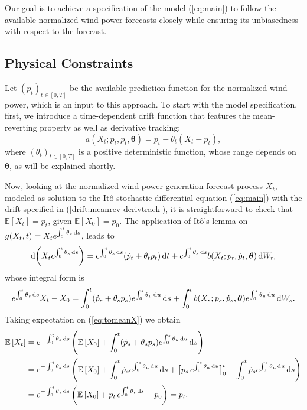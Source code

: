 \documentclass[11pt]{article}
\theoremstyle{definition}
\begin{document}
Our goal is to achieve a specification of the model (\ref{eq:main}) to follow the available normalized wind power forecasts closely while ensuring its unbiasedness with respect to the forecast.

\subsection{Physical Constraints} \label{Physical_Constraints}

Let $(p_t)_{t \in [0,T]}$ be the available prediction function for the normalized wind power, which is an input to this approach. To start with the model specification, first, we introduce a time-dependent drift function that features the mean-reverting property as well as derivative tracking:\begin{equation}
a(X_t; p_t, \dot{p}_t, \bm{\theta}) = \dot{p}_t  - \theta_t (X_t - p_t),  \label{drift:meanrev-derivtrack}
\end{equation} 
where $ (\theta_t)_{t \in [0,T]} $ is a positive deterministic function, whose range depends on $\bm{\theta}$, as will be explained shortly.

Now, looking at the normalized wind power generation forecast process $X_t$, modeled as solution to the It\^{o} stochastic differential equation (\ref{eq:main}) with the drift specified in (\ref{drift:meanrev-derivtrack}), it is straightforward to check that $\mathbb{E} \left[X_t\right] = p_t$, given $  \mathbb{E}\left[X_0\right] = p_0$. The application of  It\^{o}'s lemma on $g(X_t, t) = X_t e^{\int_{0}^{t} \theta_s \dif s}$, leads to 
\begin{equation*}
\dif \left( X_t e^{\int_{0}^{t} \theta_s \dif s} \right) = e^{\int_{0}^{t} \theta_s \dif s} (\dot{p}_t + \theta_t p_t ) \dif t  + e^{\int_{0}^{t} \theta_s \dif s}b (X_t; p_t, \dot{p}_t, \bm{\theta} ) \dif W_t,
\end{equation*}
whose integral form is
\begin{equation}
e^{\int_{0}^{t} \theta_s \dif s}  X_t - X_0 = \int_{0}^{t}  (\dot{p}_s + \theta_s p_s ) e^{\int_{0}^{s} \theta_u \dif u} \dif s + \int_{0}^{t}  b (X_s; p_s, \dot{p}_s, \bm{\theta} )  e^{\int_{0}^{s} \theta_u \dif u}\dif  W_s.   \label{eq:tomeanX}
\end{equation} 
Taking expectation on (\ref{eq:tomeanX}) we obtain
\begin{align}
\mathbb{E} \left[X_t\right] & = e^{ - \int_{0}^{t} \theta_s \dif s} \left(  \mathbb{E} \left[X_0\right] +   \int_{0}^{t}  (\dot{p}_s + \theta_s p_s ) e^{\int_{0}^{s} \theta_u \dif u} \dif s   \right) \nonumber \\ 
& =  e^{ - \int_{0}^{t} \theta_s \dif s} \left(  \mathbb{E} \left[X_0\right] +   \int_{0}^{t}  \dot{p}_s e^{\int_{0}^{s} \theta_u \dif u} \dif s +  \big[ p_s \, e^{\int_{0}^{s} \theta_u \dif u} \big]^{t}_0  - \int_{0}^{t}  \dot{p}_s e^{\int_{0}^{s} \theta_u \dif u} \dif s  \right) \nonumber \\
& =  e^{ - \int_{0}^{t} \theta_s \dif s} \left(  \mathbb{E}\left[ X_0\right] + p_t \, e^{ \int_{0}^{t} \theta_s \dif s} - p_0 \right) = p_t. \label{eq:meanX}
\end{align}
\end{document}
